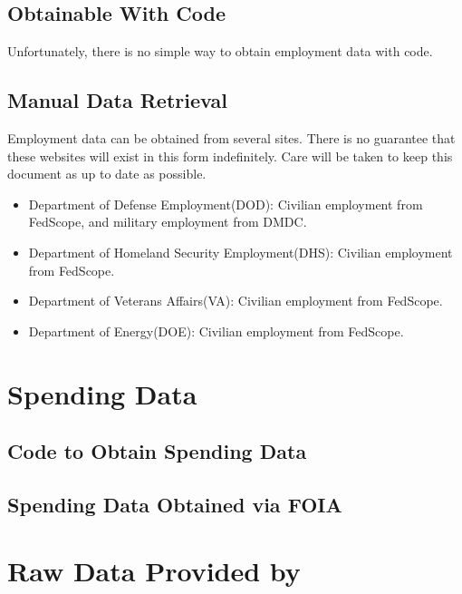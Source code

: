 \documentclass[
]{book}
\begin{document}
\hypertarget{obtainable-with-code}{%
\subsection{Obtainable With Code}\label{obtainable-with-code}}

Unfortunately, there is no simple way to obtain employment data with code.

\hypertarget{manual-data-retrieval}{%
\subsection{Manual Data Retrieval}\label{manual-data-retrieval}}

Employment data can be obtained from several sites. There is no guarantee that these websites will exist in this form indefinitely. Care will be taken to keep this document as up to date as possible.

\begin{itemize}
\item
  Department of Defense Employment(DOD): Civilian employment from FedScope, and military employment from DMDC.
\item
  Department of Homeland Security Employment(DHS): Civilian employment from FedScope.
\item
  Department of Veterans Affairs(VA): Civilian employment from FedScope.
\item
  Department of Energy(DOE): Civilian employment from FedScope.
\end{itemize}

\hypertarget{spending-data}{%
\section{Spending Data}\label{spending-data}}

\hypertarget{code-to-obtain-spending-data}{%
\subsection{Code to Obtain Spending Data}\label{code-to-obtain-spending-data}}

\hypertarget{spending-data-obtained-via-foia}{%
\subsection{Spending Data Obtained via FOIA}\label{spending-data-obtained-via-foia}}

\hypertarget{raw-data-provided-by}{%
\section{Raw Data Provided by}\label{raw-data-provided-by}}
\end{document}
